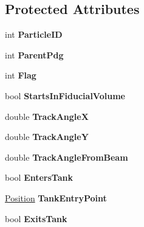 \subsection*{Protected Attributes}
\begin{DoxyCompactItemize}
\item 
\hypertarget{classMCParticle_a52ca5b486dd9ded3b7da2b77c2704f85}{int {\bfseries Particle\-I\-D}}\label{classMCParticle_a52ca5b486dd9ded3b7da2b77c2704f85}

\item 
\hypertarget{classMCParticle_aa60d9c88e4c168be89a8075414078e82}{int {\bfseries Parent\-Pdg}}\label{classMCParticle_aa60d9c88e4c168be89a8075414078e82}

\item 
\hypertarget{classMCParticle_a74ff96a2e3f2c92d991a631dc320b343}{int {\bfseries Flag}}\label{classMCParticle_a74ff96a2e3f2c92d991a631dc320b343}

\item 
\hypertarget{classMCParticle_a9328c826d1ee1d615e312d25235d04a0}{bool {\bfseries Starts\-In\-Fiducial\-Volume}}\label{classMCParticle_a9328c826d1ee1d615e312d25235d04a0}

\item 
\hypertarget{classMCParticle_aafb0416bfa7dfcaa14f4243d76930239}{double {\bfseries Track\-Angle\-X}}\label{classMCParticle_aafb0416bfa7dfcaa14f4243d76930239}

\item 
\hypertarget{classMCParticle_aaf4a5cd3469f3d527c0ac8f4e3713c4b}{double {\bfseries Track\-Angle\-Y}}\label{classMCParticle_aaf4a5cd3469f3d527c0ac8f4e3713c4b}

\item 
\hypertarget{classMCParticle_af4cdfb96769ec1a40e45c4f40b9eb520}{double {\bfseries Track\-Angle\-From\-Beam}}\label{classMCParticle_af4cdfb96769ec1a40e45c4f40b9eb520}

\item 
\hypertarget{classMCParticle_afc38d81f454f0011d513db8dedc39d37}{bool {\bfseries Enters\-Tank}}\label{classMCParticle_afc38d81f454f0011d513db8dedc39d37}

\item 
\hypertarget{classMCParticle_ad1c64ca6b80955ea88cc1014360c53fa}{\hyperlink{classPosition}{Position} {\bfseries Tank\-Entry\-Point}}\label{classMCParticle_ad1c64ca6b80955ea88cc1014360c53fa}

\item 
\hypertarget{classMCParticle_aa33826267b580a0e0083df6deaeb26ce}{bool {\bfseries Exits\-Tank}}\label{classMCParticle_aa33826267b580a0e0083df6deaeb26ce}


\end{DoxyCompactItemize}

